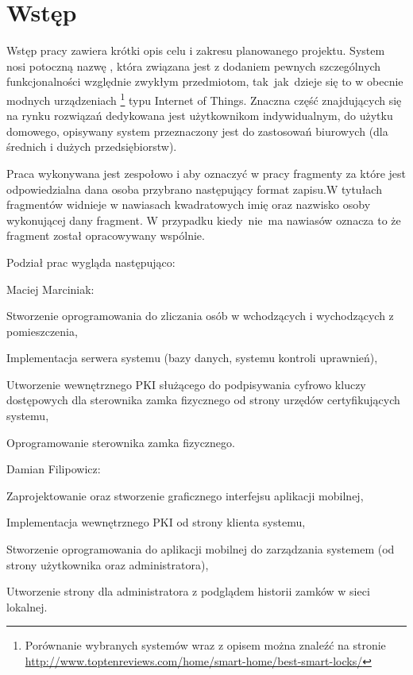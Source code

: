 \newpage\section{Wstęp}\label{sec:wstep}
Wstęp pracy zawiera krótki opis celu i zakresu planowanego projektu. System nosi potoczną nazwę \NazwaSys, która związana jest z dodaniem  pewnych szczególnych funkcjonalności względnie zwykłym przedmiotom, tak~jak~dzieje się to w obecnie modnych urządzeniach \footnote{ Porównanie wybranych systemów wraz z opisem można znaleźć na stronie \href{http://www.toptenreviews.com/home/smart-home/best-smart-locks/}{http://www.toptenreviews.com/home/smart-home/best-smart-locks/}} typu Internet of Things. Znaczna część znajdujących się na rynku rozwiązań dedykowana jest użytkownikom indywidualnym, do użytku domowego, opisywany system przeznaczony jest do zastosowań biurowych (dla średnich i dużych przedsiębiorstw).

Praca wykonywana jest zespołowo i aby oznaczyć w pracy fragmenty za które jest odpowiedzialna dana osoba przybrano następujący format zapisu.W tytułach fragmentów widnieje w nawiasach kwadratowych imię oraz nazwisko osoby wykonującej dany fragment. W przypadku kiedy~nie~ma nawiasów oznacza to że fragment został opracowywany wspólnie.

Podział prac wygląda następująco:
\begin{itemize*}
	\item Maciej Marciniak:
	\begin{enumerate*}
		\item Stworzenie oprogramowania do zliczania osób w wchodzących i wychodzących z pomieszczenia,
		\item Implementacja serwera systemu (bazy danych, systemu kontroli uprawnień),
		\item Utworzenie wewnętrznego PKI służącego do podpisywania cyfrowo kluczy dostępowych dla sterownika zamka fizycznego od strony urzędów certyfikujących systemu,
		\item Oprogramowanie sterownika zamka fizycznego.
	\end{enumerate*}
	\item Damian Filipowicz:
	\begin{enumerate*}
		\item Zaprojektowanie oraz stworzenie graficznego interfejsu aplikacji mobilnej,
		\item Implementacja wewnętrznego PKI od strony klienta systemu,
		\item Stworzenie oprogramowania do aplikacji mobilnej do zarządzania systemem (od strony użytkownika oraz administratora),
		\item Utworzenie strony dla administratora z podglądem historii zamków w sieci lokalnej.	
	\end{enumerate*}
\end{itemize*}

